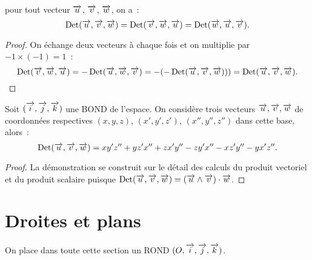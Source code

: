 \begin{cor}
  pour tout vecteur \(\vu\), \(\vv\), \(\vw\), on a~:
  \begin{equation}
    \Det(\vu, \vv, \vw) = \Det(\vv, \vw, \vu) = \Det(\vw, \vu, \vv).
  \end{equation}
\end{cor}

\begin{proof}
  On échange deux vecteurs à chaque fois et on multiplie par 
  \(-1\times(-1)=1\)~:
  \begin{equation}
    \Det(\vv, \vw, \vu) = -\Det(\vu, \vw, \vv) = -(-\Det(\vu, \vv, \vw))) = 
    \Det(\vu, \vv, \vw).
  \end{equation}
\end{proof}

\begin{prop}
  Soit \(\bondtrois\) une BOND de l'espace. On considère trois vecteurs \(\vu, 
  \vv, \vw\) de coordonnées respectives \((x, y, z)\), \((x', y', z')\), 
  \((x'', y'', z'')\) dans cette base, alors~:
  \begin{equation}
    \Det(\vu, \vv, \vw)=xy'z'' + yz'x'' + zx'y'' - zy'x'' - xz'y'' - yx'z''.
  \end{equation}
\end{prop}

\begin{proof}
  La démonstration se construit sur le détail des calculs du produit vectoriel 
  et du produit scalaire puisque \(\Det(\vu, \vv, \vw)=(\vu\wedge\vv)\cdot\vw\).
\end{proof}

\section{Droites et plans}
On place dans toute cette section un ROND \(\rondtrois\).

